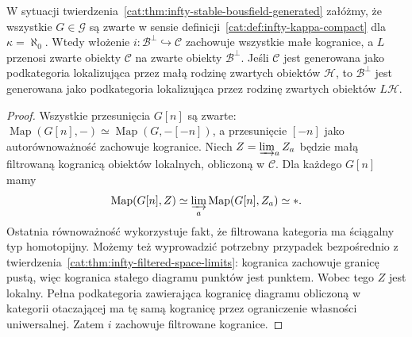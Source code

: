 \begin{twierdzenie}\label{cat:thm:infty-bousfield-compact-kernel}
W sytuacji twierdzenia~\ref{cat:thm:infty-stable-bousfield-generated} załóżmy, że wszystkie $G\in\mathcal G$ są zwarte w sensie definicji~\ref{cat:def:infty-kappa-compact} dla $\kappa=\aleph_0$. Wtedy włożenie $i:\mathcal B^\perp\hookrightarrow\mathcal C$ zachowuje wszystkie małe kogranice, a $L$ przenosi zwarte obiekty $\mathcal C$ na zwarte obiekty $\mathcal B^\perp$. Jeśli $\mathcal C$ jest generowana jako podkategoria lokalizująca przez małą rodzinę zwartych obiektów $\mathcal H$, to $\mathcal B^\perp$ jest generowana jako podkategoria lokalizująca przez rodzinę zwartych obiektów $L\mathcal H$.
\end{twierdzenie}
\begin{proof}
Wszystkie przesunięcia $G[n]$ są zwarte: $\operatorname{Map}(G[n],-)\simeq\operatorname{Map}(G,-[-n])$, a przesunięcie $[-n]$ jako autorównoważność zachowuje kogranice. Niech $Z=\varinjlim_a Z_a$ będzie małą filtrowaną kogranicą obiektów lokalnych, obliczoną w $\mathcal C$. Dla każdego $G[n]$ mamy
\[
 \operatorname{Map}(G[n],Z)
 \simeq\varinjlim_a\operatorname{Map}(G[n],Z_a)
 \simeq *.
\]
Ostatnia równoważność wykorzystuje fakt, że filtrowana kategoria ma ściągalny typ homotopijny. Możemy też wyprowadzić potrzebny przypadek bezpośrednio z twierdzenia~\ref{cat:thm:infty-filtered-space-limits}: kogranica zachowuje granicę pustą, więc kogranica stałego diagramu punktów jest punktem. Wobec tego $Z$ jest lokalny. Pełna podkategoria zawierająca kogranicę diagramu obliczoną w kategorii otaczającej ma tę samą kogranicę przez ograniczenie własności uniwersalnej. Zatem $i$ zachowuje filtrowane kogranice.


\end{proof}
